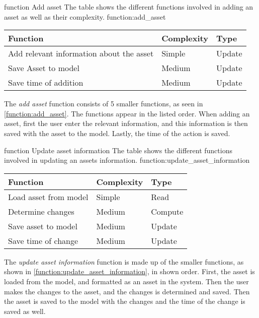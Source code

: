 \fancyLayout
    {function}
    {Add asset}
    {The table shows the different functions involved in adding an asset as well as their complexity.}
    {function:add_asset}
    {
        \centering
        \begin{tabular}{|l|l|l|}
            \hline
            \textbf{Function} & \textbf{Complexity} & \textbf{Type}\\
            \hline
            \hline
            Add relevant information about the asset & Simple & Update \\
            \hline
            Save Asset to model & Medium & Update \\
            \hline
            Save time of addition & Medium & Update \\
            \hline
        \end{tabular}
}

The \textit{add asset} function consists of 5 smaller functions, as seen in \autoref{function:add_asset}. The functions appear in the listed order. When adding an asset, first the user enter the relevant information, and this information is then saved with the asset to the model. Lastly, the time of the action is saved.

\fancyLayout
    {function}
    {Update asset information}
    {The table shows the different functions involved in updating an assets information.}
    {function:update_asset_information}
    {
        \centering
        \begin{tabular}{|l|l|l|}
            \hline
            \textbf{Function} & \textbf{Complexity} & \textbf{Type}\\
            \hline
            \hline
            Load asset from model & Simple & Read \\
            \hline
            Determine changes & Medium & Compute \\
            \hline
            Save asset to model & Medium & Update \\
            \hline
            Save time of change & Medium & Update \\
            \hline
        \end{tabular}
}

The \textit{update asset information} function is made up of the smaller functions, as shown in \autoref{function:update_asset_information}, in shown order. First, the asset is loaded from the model, and formatted as an asset in the system. Then the user makes the changes to the asset, and the changes is determined and saved. Then the asset is saved to the model with the changes and the time of the change is saved as well.

